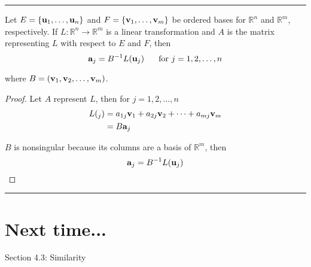 \rule[0.01in]{\textwidth}{0.0025in}









\begin{theorem}
	Let $E = \{ {\bf u}_1, \dots, {\bf u}_n \}$ and $F = \{ {\bf v}_1, \dots, {\bf v}_m \}$ be ordered bases for $\mathbb{R}^n$ and $\mathbb{R}^m$, respectively.  If $L: \mathbb{R}^n \to \mathbb{R}^m$ is a linear transformation and $A$ is the matrix representing $L$ with respect to $E$ and $F$, then 
	\[  {\bf a}_j =  B^{-1} L({\bf u}_j) \;\;\;\;\; \text{ for } j = 1, 2, \dots, n \]
	
where $B = ({\bf v}_1, {\bf v}_2, \dots, {\bf v}_m)$.
	
	\begin{proof}
		Let $A$ represent $L$, then for $j = 1, 2, \dots, n$
		\begin{align*}
			 L({\bf }_j) &= a_{1j} {\bf v}_1 + a_{2j} {\bf v}_2 + \cdots + a_{mj} {\bf v}_m\\
			 		&= B {\bf a}_j 		
		\end{align*}
		
		$B$ is nonsingular because its columns are a basis of $\mathbb{R}^m$, then 
	\[  {\bf a}_j = B^{-1} L({\bf u}_j) \]



	\end{proof}
		
\end{theorem}








\rule[0.01in]{\textwidth}{0.0025in}








\section*{Next time...}
Section 4.3: Similarity


